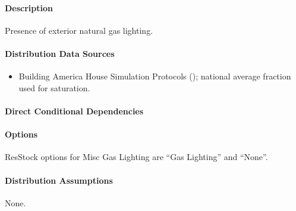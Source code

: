 \paragraph{Description}
% 
Presence of exterior natural gas lighting.

\paragraph{Distribution Data Sources}
% 
\begin{itemize}
 
\item
 Building America House Simulation Protocols (\cite{Wilson2014}); national average fraction used for saturation.
\end{itemize}

\paragraph{Direct Conditional Dependencies}


\paragraph{Options}
ResStock options for Misc Gas Lighting are ``Gas Lighting'' and ``None''.

\paragraph{Distribution Assumptions}
% 
None. 
